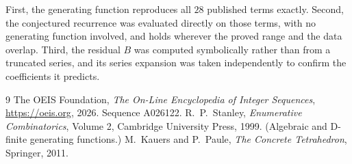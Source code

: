 \documentclass[11pt,a4paper]{article}
\theoremstyle{plain}
\theoremstyle{definition}
\begin{document}
First, the generating function reproduces all $28$ published terms exactly. Second,
the conjectured recurrence was evaluated directly on those terms, with no generating function
involved, and holds wherever the proved range and the data overlap. Third, the residual $B$ was
computed symbolically rather than from a truncated series, and its series expansion was taken
independently to confirm the coefficients it predicts.

\begin{thebibliography}{9}
 The OEIS Foundation, \emph{The On-Line Encyclopedia of Integer Sequences},
\url{https://oeis.org}, 2026. Sequence A026122.
 R.~P.~Stanley, \emph{Enumerative Combinatorics}, Volume 2, Cambridge
University Press, 1999. (Algebraic and D-finite generating functions.)
 M.~Kauers and P.~Paule, \emph{The Concrete Tetrahedron}, Springer, 2011.
\end{thebibliography}
\end{document}
